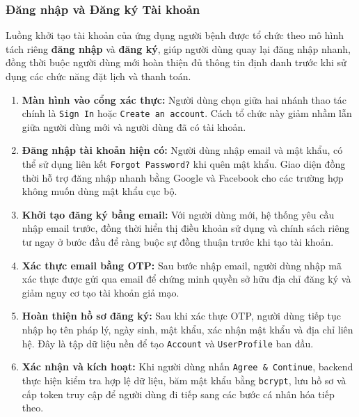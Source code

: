 \subsubsection{Đăng nhập và Đăng ký Tài khoản}

Luồng khởi tạo tài khoản của ứng dụng người bệnh được tổ chức theo mô hình tách riêng \textbf{đăng nhập} và \textbf{đăng ký}, giúp người dùng quay lại đăng nhập nhanh, đồng thời buộc người dùng mới hoàn thiện đủ thông tin định danh trước khi sử dụng các chức năng đặt lịch và thanh toán.

\begin{enumerate}
    \item \textbf{Màn hình vào cổng xác thực:} Người dùng chọn giữa hai nhánh thao tác chính là \texttt{Sign In} hoặc \texttt{Create an account}. Cách tổ chức này giảm nhầm lẫn giữa người dùng mới và người dùng đã có tài khoản.

    \item \textbf{Đăng nhập tài khoản hiện có:} Người dùng nhập email và mật khẩu, có thể sử dụng liên kết \texttt{Forgot Password?} khi quên mật khẩu. Giao diện đồng thời hỗ trợ đăng nhập nhanh bằng Google và Facebook cho các trường hợp không muốn dùng mật khẩu cục bộ.

    \item \textbf{Khởi tạo đăng ký bằng email:} Với người dùng mới, hệ thống yêu cầu nhập email trước, đồng thời hiển thị điều khoản sử dụng và chính sách riêng tư ngay ở bước đầu để ràng buộc sự đồng thuận trước khi tạo tài khoản.

    \item \textbf{Xác thực email bằng OTP:} Sau bước nhập email, người dùng nhập mã xác thực được gửi qua email để chứng minh quyền sở hữu địa chỉ đăng ký và giảm nguy cơ tạo tài khoản giả mạo.

    \item \textbf{Hoàn thiện hồ sơ đăng ký:} Sau khi xác thực OTP, người dùng tiếp tục nhập họ tên pháp lý, ngày sinh, mật khẩu, xác nhận mật khẩu và địa chỉ liên hệ. Đây là tập dữ liệu nền để tạo \texttt{Account} và \texttt{UserProfile} ban đầu.

    \item \textbf{Xác nhận và kích hoạt:} Khi người dùng nhấn \texttt{Agree \& Continue}, backend thực hiện kiểm tra hợp lệ dữ liệu, băm mật khẩu bằng \texttt{bcrypt}, lưu hồ sơ và cấp token truy cập để người dùng đi tiếp sang các bước cá nhân hóa tiếp theo.
\end{enumerate}

